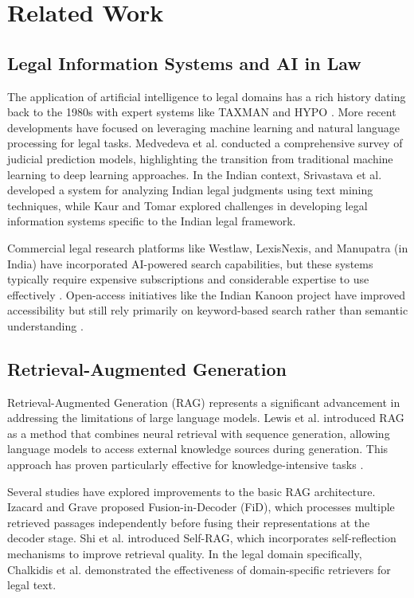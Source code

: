\documentclass[conference]{IEEEtran}
\begin{document}
\section{Related Work}

\subsection{Legal Information Systems and AI in Law}

The application of artificial intelligence to legal domains has a rich history dating back to the 1980s with expert systems like TAXMAN \cite{mccarty1977} and HYPO \cite{ashley1991}. More recent developments have focused on leveraging machine learning and natural language processing for legal tasks. Medvedeva et al. \cite{medvedeva2020} conducted a comprehensive survey of judicial prediction models, highlighting the transition from traditional machine learning to deep learning approaches. In the Indian context, Srivastava et al. \cite{srivastava2020} developed a system for analyzing Indian legal judgments using text mining techniques, while Kaur and Tomar \cite{kaur2019} explored challenges in developing legal information systems specific to the Indian legal framework.

Commercial legal research platforms like Westlaw, LexisNexis, and Manupatra (in India) have incorporated AI-powered search capabilities, but these systems typically require expensive subscriptions and considerable expertise to use effectively \cite{mart2017}. Open-access initiatives like the Indian Kanoon project have improved accessibility but still rely primarily on keyword-based search rather than semantic understanding \cite{mittal2019}.

\subsection{Retrieval-Augmented Generation}

Retrieval-Augmented Generation (RAG) represents a significant advancement in addressing the limitations of large language models. Lewis et al. \cite{lewis2020} introduced RAG as a method that combines neural retrieval with sequence generation, allowing language models to access external knowledge sources during generation. This approach has proven particularly effective for knowledge-intensive tasks \cite{petroni2021}.

Several studies have explored improvements to the basic RAG architecture. Izacard and Grave \cite{izacard2021} proposed Fusion-in-Decoder (FiD), which processes multiple retrieved passages independently before fusing their representations at the decoder stage. Shi et al. \cite{shi2023} introduced Self-RAG, which incorporates self-reflection mechanisms to improve retrieval quality. In the legal domain specifically, Chalkidis et al. \cite{chalkidis2022} demonstrated the effectiveness of domain-specific retrievers for legal text.
\end{document}

